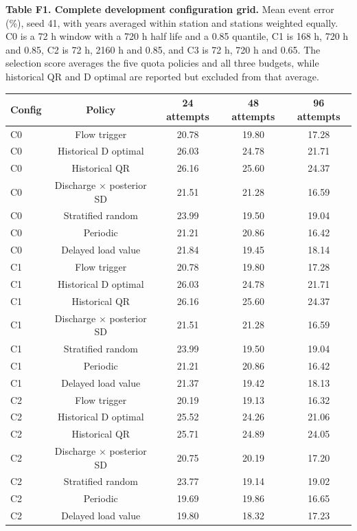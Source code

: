 \documentclass[lineno,pdflatex,sn-apa]{sn-jnl}%
\theoremstyle{thmstyleone}%
\theoremstyle{thmstyletwo}%
\theoremstyle{thmstylethree}%
\begin{document}
\textbf{Table F1. Complete development configuration grid.} Mean event error (\%), seed 41, with years averaged within station and stations weighted equally. C0 is a 72 h window with a 720 h half life and a 0.85 quantile, C1 is 168 h, 720 h and 0.85, C2 is 72 h, 2160 h and 0.85, and C3 is 72 h, 720 h and 0.65. The selection score averages the five quota policies and all three budgets, while historical QR and D optimal are reported but excluded from that average.

\begin{center}
\footnotesize
\setlength{\tabcolsep}{2pt}
\begin{tabular}{@{}lcccc@{}}
\toprule
Config & Policy & 24 attempts & 48 attempts & 96 attempts\\
\midrule
C0 & Flow trigger & 20.78 & 19.80 & 17.28\\
C0 & Historical D optimal & 26.03 & 24.78 & 21.71\\
C0 & Historical QR & 26.16 & 25.60 & 24.37\\
C0 & Discharge $\times$ posterior SD & 21.51 & 21.28 & 16.59\\
C0 & Stratified random & 23.99 & 19.50 & 19.04\\
C0 & Periodic & 21.21 & 20.86 & 16.42\\
C0 & Delayed load value & 21.84 & 19.45 & 18.14\\
C1 & Flow trigger & 20.78 & 19.80 & 17.28\\
C1 & Historical D optimal & 26.03 & 24.78 & 21.71\\
C1 & Historical QR & 26.16 & 25.60 & 24.37\\
C1 & Discharge $\times$ posterior SD & 21.51 & 21.28 & 16.59\\
C1 & Stratified random & 23.99 & 19.50 & 19.04\\
C1 & Periodic & 21.21 & 20.86 & 16.42\\
C1 & Delayed load value & 21.37 & 19.42 & 18.13\\
C2 & Flow trigger & 20.19 & 19.13 & 16.32\\
C2 & Historical D optimal & 25.52 & 24.26 & 21.06\\
C2 & Historical QR & 25.71 & 24.89 & 24.05\\
C2 & Discharge $\times$ posterior SD & 20.75 & 20.19 & 17.20\\
C2 & Stratified random & 23.77 & 19.14 & 19.02\\
C2 & Periodic & 19.69 & 19.86 & 16.65\\
C2 & Delayed load value & 19.80 & 18.32 & 17.23\\

\end{tabular}
\end{center}
\end{document}
